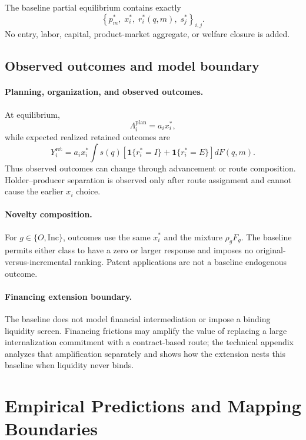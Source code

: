 \documentclass[12pt]{article}
\newcommand{\1}{\mathbf{1}}
\begin{document}
The baseline partial equilibrium contains exactly
\begin{equation}
  \left\{
  p_m^*,\;
  x_i^*,\;
  r_i^*(q,m),\;
  s_j^*
  \right\}_{i,j}.
  \label{eq:p16m-equilibrium}
\end{equation}
No entry, labor, capital, product-market aggregate, or welfare closure is
added.

\subsection{Observed outcomes and model boundary}
\label{subsec:p16m-predictions}

\paragraph{Planning, organization, and observed outcomes.}
At equilibrium,
\[
  \Lambda_i^{\mathrm{plan}}=a_ix_i^*,
\]
while expected realized retained outcomes are
\begin{equation}
  Y_i^{\mathrm{ret}}
  =
  a_ix_i^*
  \int s(q)
  \left[
  \mathbf 1\{r_i^*=I\}
  +
  \mathbf 1\{r_i^*=E\}
  \right]dF(q,m).
  \label{eq:p16m-retained-outcome}
\end{equation}
Thus observed outcomes can change through advancement or route composition.
Holder--producer separation is observed only after route assignment and
cannot cause the earlier \(x_i\) choice.

\paragraph{Novelty composition.}
For \(g\in\{O,\mathrm{Inc}\}\), outcomes use the same \(x_i^*\) and the
mixture \(\rho_gF_g\). The baseline permits either class to have a zero or
larger response and imposes no original-versus-incremental ranking. Patent
applications are not a baseline endogenous outcome.

\paragraph{Financing extension boundary.}
The baseline does not model financial intermediation or impose a binding
liquidity screen. Financing frictions may amplify the value of replacing a
large internalization commitment with a contract-based route; the technical
appendix analyzes that amplification separately and shows how the extension
nests this baseline when liquidity never binds.

\section{Empirical Predictions and Mapping Boundaries}
\end{document}
